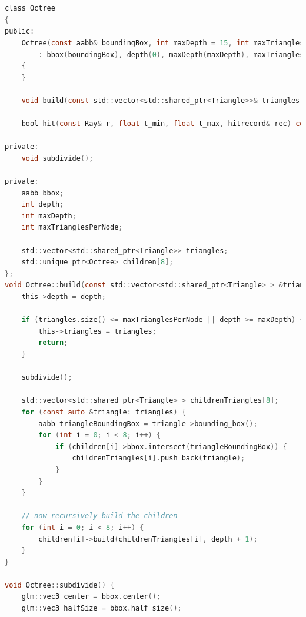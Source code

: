 \documentclass[../main.tex]{subfiles}
\begin{document}
\begin{lstlisting}[language=C, caption="Oct-Tree definition and implementation", breaklines=true]


class Octree
{
public:
    Octree(const aabb& boundingBox, int maxDepth = 15, int maxTrianglesPerNode = 100)
        : bbox(boundingBox), depth(0), maxDepth(maxDepth), maxTrianglesPerNode(maxTrianglesPerNode)
    {
    }

    void build(const std::vector<std::shared_ptr<Triangle>>& triangles, int depth = 0);

    bool hit(const Ray& r, float t_min, float t_max, hitrecord& rec) const;

private:
    void subdivide();

private:
    aabb bbox;
    int depth;
    int maxDepth;
    int maxTrianglesPerNode;

    std::vector<std::shared_ptr<Triangle>> triangles;
    std::unique_ptr<Octree> children[8];
};
void Octree::build(const std::vector<std::shared_ptr<Triangle> > &triangles, int depth) {
    this->depth = depth;

    if (triangles.size() <= maxTrianglesPerNode || depth >= maxDepth) {
        this->triangles = triangles;
        return;
    }

    subdivide();

    std::vector<std::shared_ptr<Triangle> > childrenTriangles[8];
    for (const auto &triangle: triangles) {
        aabb triangleBoundingBox = triangle->bounding_box();
        for (int i = 0; i < 8; i++) {
            if (children[i]->bbox.intersect(triangleBoundingBox)) {
                childrenTriangles[i].push_back(triangle);
            }
        }
    }

    // now recursively build the children
    for (int i = 0; i < 8; i++) {
        children[i]->build(childrenTriangles[i], depth + 1);
    }
}

void Octree::subdivide() {
    glm::vec3 center = bbox.center();
    glm::vec3 halfSize = bbox.half_size();


\end{lstlisting}
\end{document}
